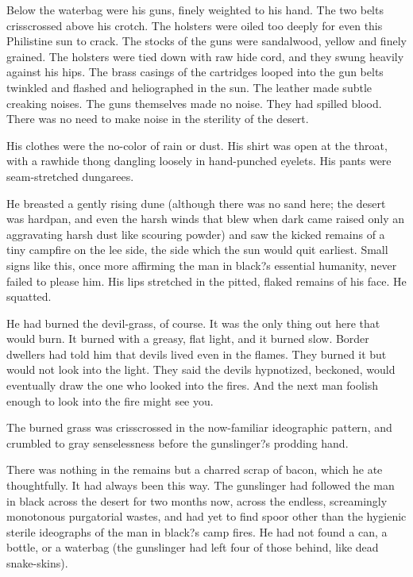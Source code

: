 \documentclass[
11pt,%
tightenlines,%
twoside,%
onecolumn,%
nofloats,%
nobibnotes,%
nofootinbib,%
superscriptaddress,%
noshowpacs,%
centertags]%
{revtex4}
\begin{document}
Below the waterbag were his guns, finely weighted to his hand. The two belts crisscrossed above his crotch. The holsters were oiled too deeply for even this Philistine sun to crack. The stocks of the guns were sandalwood, yellow and finely grained. The holsters were tied down with raw hide cord, and they swung heavily against his hips. The brass casings of the cartridges looped into the gun belts twinkled and flashed and heliographed in the sun. The leather made subtle creaking noises. The guns themselves made no noise. They had spilled blood. There was no need to make noise in the sterility of the desert.

His clothes were the no-color of rain or dust. His shirt was open at the throat, with a rawhide thong dangling loosely in hand-punched eyelets. His pants were seam-stretched dungarees.

He breasted a gently rising dune (although there was no sand here; the desert was hardpan, and even the harsh winds that blew when dark came raised only an aggravating harsh dust like scouring powder) and saw the kicked remains of a tiny campfire on the lee side, the side which the sun would quit earliest. Small signs like this, once more affirming the man in black?s essential humanity, never failed to please him. His lips stretched in the pitted, flaked remains of his face. He squatted.

He had burned the devil-grass, of course. It was the only thing out here that would burn. It burned with a greasy, flat light, and it burned slow. Border dwellers had told him that devils lived even in the flames. They burned it but would not look into the light. They said the devils hypnotized, beckoned, would eventually draw the one who looked into the fires. And the next man foolish enough to look into the fire might see you.

The burned grass was crisscrossed in the now-familiar ideographic pattern, and crumbled to gray senselessness before the gunslinger?s prodding hand. 

There was nothing in the remains but a charred scrap of bacon, which he ate thoughtfully. It had always been this way. The gunslinger had followed the man in black across the desert for two months now, across the endless, screamingly monotonous purgatorial wastes, and had yet to find spoor other than the hygienic sterile ideographs of the man in black?s camp fires. He had not found a can, a bottle, or a waterbag (the gunslinger had left four of those behind, like dead snake-skins).
\end{document}
